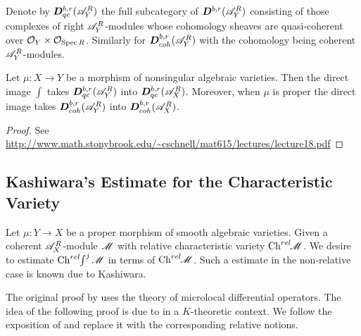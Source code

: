     Denote by $\boldsymbol{D}^{b,r}_{qc}(\mathscr{A}_Y^{R})$ the full subcategory of $\boldsymbol{D}^{b,r}(\mathscr{A}_Y^R)$ consisting of those complexes of right $\mathscr{A}_Y^R$-modules whose cohomology sheaves are quasi-coherent over $\mathcal{O}_Y\times \mathcal{O}_{\operatorname{Spec} R}$. Similarly for $\boldsymbol{D}^{b,r}_{coh}(\mathscr{A}_Y^R)$ with the cohomology being coherent $\mathscr{A}_Y^R$-modules.
    \begin{theorem}\label{thm: ConservationQuasiCoherentAndCoherentIfProper}
        Let $\mu:X\to Y$ be a morphism of nonsingular algebraic varieties. Then the direct image $\int$ takes $\boldsymbol{D}^{b,r}_{qc}(\mathscr{A}_Y^{R})$ into $\boldsymbol{D}^{b,r}_{qc}(\mathscr{A}_X^{R})$. Moreover, when $\mu$ is proper the direct image takes $\boldsymbol{D}^{b,r}_{coh}(\mathscr{A}_Y^R)$ into $\boldsymbol{D}^{b,r}_{coh}(\mathscr{A}_X^R)$.
    \end{theorem}
    \begin{proof}
      See \url{http://www.math.stonybrook.edu/~cschnell/mat615/lectures/lecture18.pdf}
    \end{proof}
\subsection{Kashiwara's Estimate for the Characteristic Variety}
Let $\mu:Y\to X$ be a proper morphism of smooth algebraic varieties. Given a coherent $\mathscr{A}_X^R$-module $\mathscr{M}$ with relative characteristic variety $\operatorname{Ch}^{rel}\mkern-5mu \mathscr{M}$. We desire to estimate $\operatorname{Ch}^{rel}\mkern-5mu \int^j \mathscr{M}$ in terms of $\operatorname{Ch}^{rel}\mkern-5mu\mathscr{M}$. Such a estimate in the non-relative case is known due to Kashiwara. %

The original proof by \cite{kashiwara1976b} uses the theory of microlocal differential operators. The idea of the following proof is due to \cite{malgrange1985images} in a $K$-theoretic context. We follow the exposition of \cite{sabbah2011introduction} and replace it with the corresponding relative notions. %
\\

